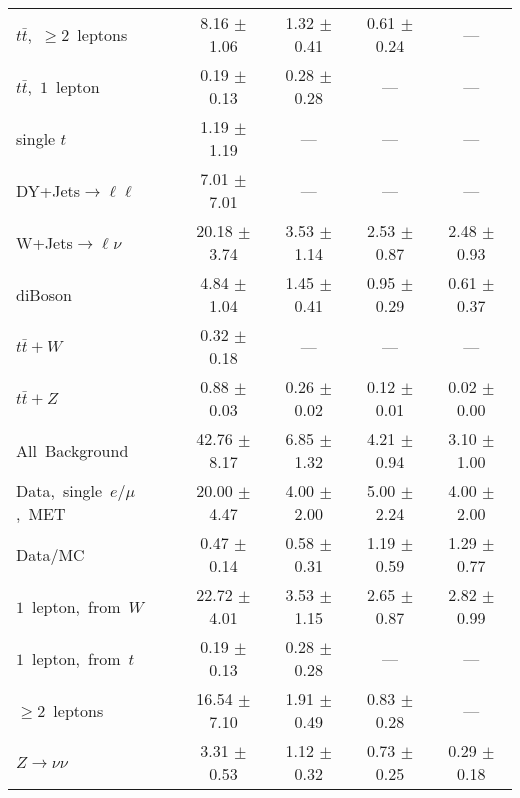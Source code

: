 \documentclass{article}
\begin{document}
\begin{longtable}{|l|c|c|c|c|}
$t\bar{t}$,~$\ge2$~leptons & 8.16 $\pm$ 1.06  & 1.32 $\pm$ 0.41  & 0.61 $\pm$ 0.24  & --- \\* 
$t\bar{t}$,~$1$~lepton & 0.19 $\pm$ 0.13  & 0.28 $\pm$ 0.28  & ---  & --- \\* 
single $t$  & 1.19 $\pm$ 1.19  & ---  & ---  & --- \\* 
DY+Jets$\rightarrow\ell\ell$  & 7.01 $\pm$ 7.01  & ---  & ---  & --- \\* 
W+Jets$\rightarrow\ell\nu$  & 20.18 $\pm$ 3.74  & 3.53 $\pm$ 1.14  & 2.53 $\pm$ 0.87  & 2.48 $\pm$ 0.93 \\* 
diBoson  & 4.84 $\pm$ 1.04  & 1.45 $\pm$ 0.41  & 0.95 $\pm$ 0.29  & 0.61 $\pm$ 0.37 \\* 
$t\bar{t}+W$  & 0.32 $\pm$ 0.18  & ---  & ---  & --- \\* 
$t\bar{t}+Z$  & 0.88 $\pm$ 0.03  & 0.26 $\pm$ 0.02  & 0.12 $\pm$ 0.01  & 0.02 $\pm$ 0.00 \\* 
\hline \hline 
All~Background  & 42.76 $\pm$ 8.17  & 6.85 $\pm$ 1.32  & 4.21 $\pm$ 0.94  & 3.10 $\pm$ 1.00 \\* 
Data,~single~$e/\mu$,~MET  & 20.00 $\pm$ 4.47  & 4.00 $\pm$ 2.00  & 5.00 $\pm$ 2.24  & 4.00 $\pm$ 2.00 \\* 
Data/MC  & 0.47 $\pm$ 0.14  & 0.58 $\pm$ 0.31  & 1.19 $\pm$ 0.59  & 1.29 $\pm$ 0.77 \\* 
\hline \hline 
$1$~lepton,~from~$W$  & 22.72 $\pm$ 4.01  & 3.53 $\pm$ 1.15  & 2.65 $\pm$ 0.87  & 2.82 $\pm$ 0.99 \\* 
$1$~lepton,~from~$t$  & 0.19 $\pm$ 0.13  & 0.28 $\pm$ 0.28  & ---  & --- \\* 
$\ge2$~leptons  & 16.54 $\pm$ 7.10  & 1.91 $\pm$ 0.49  & 0.83 $\pm$ 0.28  & --- \\* 
$Z\rightarrow\nu\nu$  & 3.31 $\pm$ 0.53  & 1.12 $\pm$ 0.32  & 0.73 $\pm$ 0.25  & 0.29 $\pm$ 0.18 \\* 
\hline 
\end{longtable} 

 
 
 
 
\pagebreak 

 
 
 
 
\end{document}
